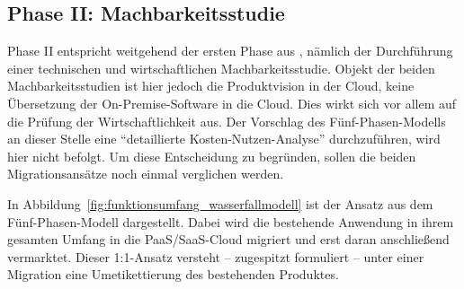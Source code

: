 \begin{comment}
\subsubsection{SWOT-Analyse}
Aus \pcite{}{}{cloud-computing_the_business_perspective}
\begin{description}
	\item[Strengths] \hfill \\
	\begin{itemize}
		\item Skalierbarkeit
		\item 
	\end{itemize}
	\item[Weaknesses] \hfill \\
	\item[Opportunities] \hfill \\
	\item[Threats] \hfill \\
	
\end{description}
\end{comment}



\subsection{Phase II: Machbarkeitsstudie}
\label{cha:phaseII}
Phase II entspricht weitgehend der ersten Phase aus , 
nämlich der Durchführung einer technischen und wirtschaftlichen 
Machbarkeitsstudie. Objekt der beiden Machbarkeitsstudien ist hier jedoch die 
Produktvision in der Cloud, keine Übersetzung der On-Premise-Software in die 
Cloud.
Dies wirkt sich vor allem auf die Prüfung der Wirtschaftlichkeit aus. Der 
Vorschlag des Fünf-Phasen-Modells an dieser Stelle eine "`detaillierte 
Kosten-Nutzen-Analyse"' durchzuführen, wird hier nicht 
befolgt. Um diese Entscheidung zu begründen, sollen die beiden 
Migrationsansätze noch einmal verglichen werden.


In Abbildung~\ref{fig:funktionsumfang_wasserfallmodell} ist der Ansatz aus dem 
Fünf-Phasen-Modell dargestellt. Dabei wird die bestehende Anwendung in ihrem 
gesamten Umfang in die PaaS/SaaS-Cloud migriert und erst daran anschließend 
vermarktet. Dieser 1:1-Ansatz versteht -- zugespitzt formuliert -- unter einer 
Migration eine Um­eti­ket­tie­rung des bestehenden Produktes.

